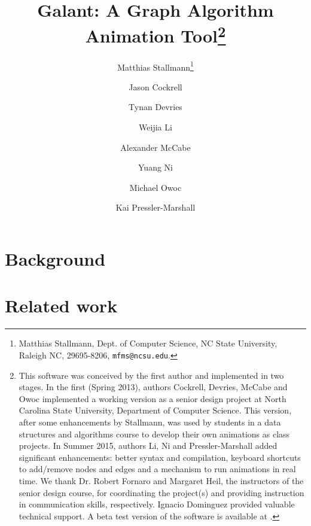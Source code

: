 \documentclass{article}
\begin{document}
\title{Galant: A Graph Algorithm Animation Tool\thanks{
    This software was conceived by the first author and implemented in
    two stages.
    In the first (Spring 2013), authors Cockrell, Devries, McCabe and Owoc implemented a
    working version as
    a senior design project at North Carolina
    State University, Department of Computer Science.
    This version, after some enhancements by Stallmann,
    was used by students in a data structures and algorithms course to develop
    their own animations as class projects.
    In Summer 2015, authors Li, Ni and Pressler-Marshall
    added significant enhancements: better syntax and compilation, keyboard shortcuts to add/remove nodes and edges and a mechanism to run animations in real time.
    We thank Dr. Robert Fornaro and Margaret Heil, the instructors of the senior design course, for
    coordinating the project(s) and providing instruction in communication
    skills, respectively. Ignacio Dominguez provided valuable technical
    support.
    A beta test version of the software is available at .
  }
}
\author{Matthias Stallmann\thanks{Matthias Stallmann, Dept. of Computer
    Science, NC State University, Raleigh NC, 29695-8206,
    \texttt{mfms@ncsu.edu}.
  }
  \and Jason Cockrell
  \and Tynan Devries
  \and Weijia Li
  \and Alexander McCabe
  \and Yuang Ni
  \and Michael Owoc
  \and Kai Pressler-Marshall
}

\maketitle

\begin{abstract}



\end{abstract}

\section{Background}



\section{Related work}
\end{document}
